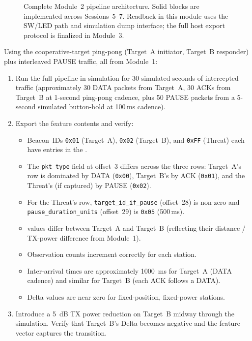 \documentclass[11pt,letterpaper]{article}
\begin{document}
\begin{figure}[ht!]
{%
		}
		\caption{Complete Module~2 \FPGA{} pipeline architecture. Solid blocks are implemented across Sessions~5--7. Readback in this module uses the SW/LED path and simulation dump interface; the full host export protocol is finalized in Module~3.}
		\label{fig:full_pipeline}
	\end{figure}

	\begin{tcolorbox}[infobox={Exercise: Feature Vector Verification}]
		Using the cooperative-target ping-pong (Target~A initiator, Target~B responder) plus interleaved PAUSE traffic, all from Module~1:
		\begin{enumerate}
			\item Run the full \FPGA{} pipeline in simulation for 30 simulated seconds of intercepted traffic (approximately 30 DATA packets from Target~A, 30 ACKs from Target~B at 1-second ping-pong cadence, plus 50 PAUSE packets from a 5-second simulated button-hold at 100\,ms cadence).
			\item Export the feature \BRAM{} contents and verify:
			\begin{itemize}
				\item Beacon~IDs \texttt{0x01} (Target~A), \texttt{0x02} (Target~B), and \texttt{0xFF} (Threat) each have entries in the \BRAM{}.
				\item The \texttt{pkt\_type} field at offset~3 differs across the three rows: Target~A's row is dominated by DATA (\texttt{0x00}), Target~B's by ACK (\texttt{0x01}), and the Threat's (if captured) by PAUSE (\texttt{0x02}).
				\item For the Threat's row, \texttt{target\_id\_if\_pause} (offset~28) is non-zero and \texttt{pause\_duration\_units} (offset~29) is \texttt{0x05} (500\,ms).
				\item \RSSI{} values differ between Target~A and Target~B (reflecting their distance / TX-power difference from Module~1).
				\item Observation counts increment correctly for each station.
				\item Inter-arrival times are approximately 1000~ms for Target~A (DATA cadence) and similar for Target~B (each ACK follows a DATA).
				\item \RSSI{} Delta values are near zero for fixed-position, fixed-power stations.
			\end{itemize}
			\item Introduce a 5~dB TX power reduction on Target~B midway through the simulation. Verify that Target~B's \RSSI{} Delta becomes negative and the feature vector captures the transition.
		\end{enumerate}
	\end{tcolorbox}
\end{document}
